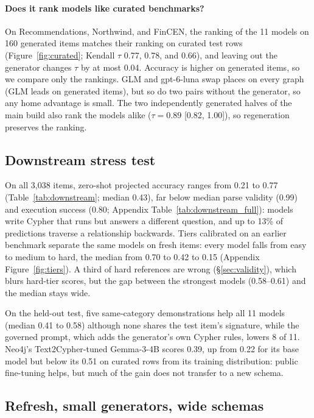 \documentclass[11pt]{article}
\begin{document}
\paragraph{Does it rank models like curated benchmarks?} On Recommendations, Northwind, and FinCEN, the ranking of the 11 models on 160 generated items matches their ranking on curated test rows (Figure~\ref{fig:curated}; Kendall $\tau$ 0.77, 0.78, and 0.66), and leaving out the generator changes $\tau$ by at most 0.04. Accuracy is higher on generated items, so we compare only the rankings. GLM and gpt-6-luna swap places on every graph (GLM leads on generated items), but so do two pairs without the generator, so any home advantage is small. The two independently generated halves of the main build also rank the models alike ($\tau=0.89$ [0.82, 1.00]), so regeneration preserves the ranking.

\subsection{Downstream stress test}
\label{sec:downstream}


On all 3,038 items, zero-shot projected accuracy ranges from 0.21 to 0.77 (Table~\ref{tab:downstream}; median 0.43), far below median parse validity (0.99) and execution success (0.80; Appendix Table~\ref{tab:downstream_full}): models write Cypher that runs but answers a different question, and up to 13\% of predictions traverse a relationship backwards. Tiers calibrated on an earlier benchmark separate the same models on fresh items: every model falls from easy to medium to hard, the median from 0.70 to 0.42 to 0.15 (Appendix Figure~\ref{fig:tiers}). A third of hard references are wrong (\S\ref{sec:validity}), which blurs hard-tier scores, but the gap between the strongest models (0.58--0.61) and the median stays wide.

On the held-out test, five same-category demonstrations help all 11 models (median 0.41 to 0.58) although none shares the test item's signature, while the governed prompt, which adds the generator's own Cypher rules, lowers 8 of 11. Neo4j's Text2Cypher-tuned Gemma-3-4B scores 0.39, up from 0.22 for its base model but below its 0.51 on curated rows from its training distribution: public fine-tuning helps, but much of the gain does not transfer to a new schema.

\subsection{Refresh, small generators, wide schemas}
\label{sec:refresh}
\end{document}
